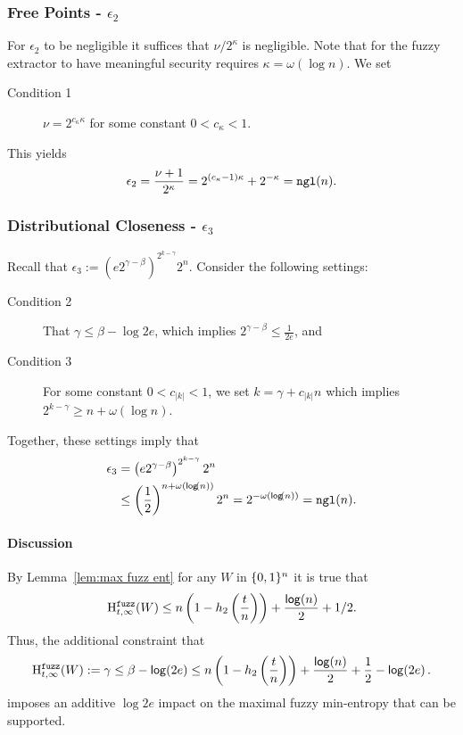\subsubsection{Free Points - $\epsilon_2$}
For $\epsilon_2$ to be negligible it suffices that $\nu/2^\kappa$ is negligible.  Note that for the fuzzy extractor to have meaningful security requires $\kappa = \omega(\log{n})$.  We set
\begin{description}
\item[Condition 1] $\nu = 2^{c_{\kappa}\kappa}$ for some constant $0 < c_{\kappa}<1$.
\end{description} 
This yields 
\[
\epsilon_2= \frac{\nu+1}{2^\kappa} = 2^{(c_{\kappa}-1)\kappa}+ 2^{-\kappa} = \mathtt{ngl}(n).
\]
\subsubsection{Distributional Closeness - $\epsilon_3$}
Recall that $\epsilon_3:=\left(e2^{\gamma-\beta}\right)^{2^{k-\gamma}}2^n$.  Consider the following settings:
\begin{description}
\item[Condition 2] That $\gamma\le \beta-\log{2e}$, which implies $2^{\gamma - \beta} \le \frac{1}{2e}$, and 
\item[Condition 3] For some constant $0<c_{|k|} < 1$, we set $k = \gamma + c_{|k|}n$ which implies $2^{k-\gamma}\ge n+\omega(\log{n})$. 
\end{description}
Together, these settings imply that 
\begin{align*}
\epsilon_3&=\left(e2^{\gamma-\beta}\right)^{2^{k-\gamma}}2^n\\
&\le\left(\frac{1}{2}\right)^{n+\omega(\mathsf{log}\!\left(n\right))}2^n= 2^{-\omega(\mathsf{log}\!\left(n\right))} = \mathtt{ngl}(n).
\end{align*}

\paragraph{Discussion}
By Lemma~\ref{lem:max fuzz ent} for any $W$ in $\{0, 1\}^n$ it is true that \[
\mathrm{H}^{\mathtt{fuzz}}_{t,\infty}(W)\le n\left(1-h_2\left(\frac{t}{n}\right)\right)+ \frac{\mathsf{log}\!\left(n\right)}{2} +1/2.\]  Thus, the additional constraint that 
\[
\mathrm{H}^{\mathtt{fuzz}}_{t,\infty}(W):=\gamma \le \beta - \mathsf{log}\!\left(2e\right)
\le n\left(1-h_2\left(\frac{t}{n}\right)\right)+\frac{\mathsf{log}\!\left(n\right)}{2}+\frac{1}{2}-\mathsf{log}\!\left(2e\right).\] imposes an additive $\log{2e}$ impact on the maximal fuzzy min-entropy that can be supported. 


